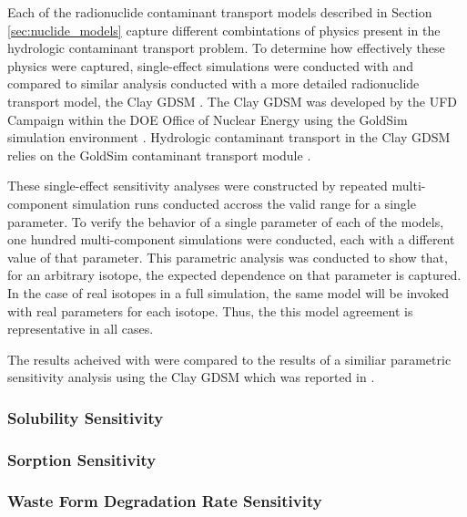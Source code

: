 
Each of the radionuclide contaminant transport models described in Section
\ref{sec:nuclide_models} capture different combintations of physics present in
the hydrologic contaminant transport problem. To determine how effectively
these physics were captured, single-effect simulations were conducted with
\Cyder and compared to similar analysis \cite{huff_key_2012} conducted with a
more detailed radionuclide transport model, the Clay \gls{GDSM}
\cite{clayton_generic_2011}. The Clay \gls{GDSM} was developed by the \gls{UFD}
Campaign within the \gls{DOE} Office of Nuclear Energy using the GoldSim
simulation environment \cite{golder_associates_goldsim_2010}. Hydrologic
contaminant transport in the Clay \gls{GDSM} relies on the GoldSim contaminant
transport module \cite{golder_associates_goldsim_2010-1}.

These single-effect sensitivity analyses were constructed by repeated
multi-component simulation runs conducted accross the valid range for a single
parameter. To verify the behavior of a single parameter of each of the \Cyder
models, one hundred multi-component simulations were conducted, each with a
different value of that parameter.  This parametric analysis was conducted to
show that, for an arbitrary isotope, the expected dependence on that parameter
is captured. In the case of real isotopes in a full simulation, the same model
will be invoked with real parameters for each isotope. Thus, the this model
agreement is representative in all cases.

The results acheived with \Cyder were compared to the results of a similiar
parametric sensitivity analysis using the Clay \gls{GDSM} which was reported in
\cite{huff_key_2012}.

\subsubsection{Solubility Sensitivity}

\FloatBarrier
\subsubsection{Sorption Sensitivity}

\FloatBarrier
\subsubsection{Waste Form Degradation Rate Sensitivity}

\FloatBarrier
